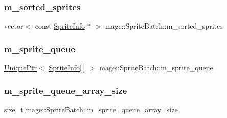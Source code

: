 \hypertarget{classmage_1_1_sprite_batch_a65ad09d31c928ab1522d8b2c0c509b9a}{}\label{classmage_1_1_sprite_batch_a65ad09d31c928ab1522d8b2c0c509b9a} 
\subsubsection{\texorpdfstring{m\+\_\+sorted\+\_\+sprites}{m\_sorted\_sprites}}
{\footnotesize\ttfamily vector$<$ const \hyperlink{structmage_1_1_sprite_info}{Sprite\+Info} $\ast$ $>$ mage\+::\+Sprite\+Batch\+::m\+\_\+sorted\+\_\+sprites\hspace{0.3cm}{\ttfamily [private]}}

\hypertarget{classmage_1_1_sprite_batch_a67ab116e403b626771f03f527efa6f2f}{}\label{classmage_1_1_sprite_batch_a67ab116e403b626771f03f527efa6f2f} 
\subsubsection{\texorpdfstring{m\+\_\+sprite\+\_\+queue}{m\_sprite\_queue}}
{\footnotesize\ttfamily \hyperlink{namespacemage_a8c307fbcc33bce9b7f2aa4c26c3b95cf}{Unique\+Ptr}$<$ \hyperlink{structmage_1_1_sprite_info}{Sprite\+Info}\mbox{[}$\,$\mbox{]} $>$ mage\+::\+Sprite\+Batch\+::m\+\_\+sprite\+\_\+queue\hspace{0.3cm}{\ttfamily [private]}}

\hypertarget{classmage_1_1_sprite_batch_a207760f2e11b1ea199529c65c9b21b3b}{}\label{classmage_1_1_sprite_batch_a207760f2e11b1ea199529c65c9b21b3b} 
\subsubsection{\texorpdfstring{m\+\_\+sprite\+\_\+queue\+\_\+array\+\_\+size}{m\_sprite\_queue\_array\_size}}
{\footnotesize\ttfamily size\+\_\+t mage\+::\+Sprite\+Batch\+::m\+\_\+sprite\+\_\+queue\+\_\+array\+\_\+size\hspace{0.3cm}{\ttfamily [private]}}

